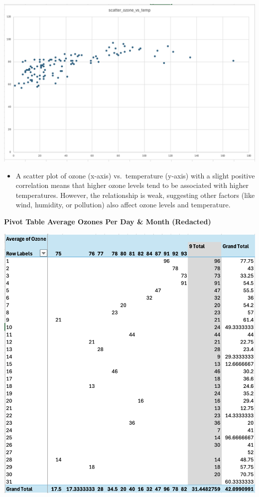 \documentclass[
  letterpaper,
  DIV=11,
  numbers=noendperiod]{scrreprt}
\providecommand{\tightlist}{%
  \setlength{\itemsep}{0pt}\setlength{\parskip}{0pt}}\usepackage{longtable,booktabs,array}
\begin{document}
\includegraphics{scatter_ozone_vs_temp_baruga.png}

\begin{itemize}
\tightlist
\item
  A scatter plot of ozone (x-axis) vs.~temperature (y-axis) with a
  slight positive correlation means that higher ozone levels tend to be
  associated with higher temperatures. However, the relationship is
  weak, suggesting other factors (like wind, humidity, or pollution)
  also affect ozone levels and temperature.
\end{itemize}

\textbf{Pivot Table Average Ozones Per Day \& Month (Redacted)}

\includegraphics{pivot4_table_baruga.png}
\end{document}
